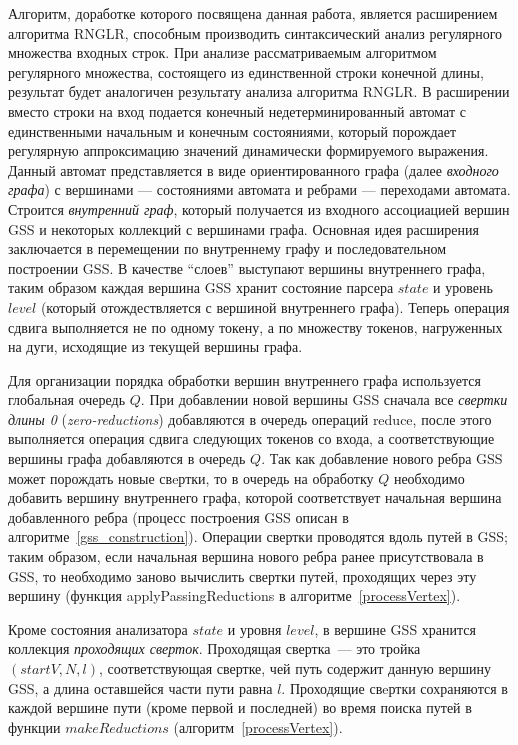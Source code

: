 Алгоритм, доработке которого посвящена данная работа, является расширением алгоритма RNGLR, способным производить синтаксический анализ регулярного множества входных строк. При анализе рассматриваемым алгоритмом регулярного множества, состоящего из единственной строки конечной длины, результат будет аналогичен результату анализа алгоритма RNGLR. В расширении вместо строки на вход подается конечный недетерминированный автомат с единственными начальным и конечным состояниями, который порождает регулярную аппроксимацию значений динамически формируемого выражения. Данный автомат представляется в виде ориентированного графа (далее \emph{входного графа}) с вершинами --- состояниями автомата и ребрами --- переходами автомата. Строится \emph{внутренний граф}, который получается из входного ассоциацией вершин GSS и некоторых коллекций с вершинами графа. Основная идея расширения заключается в перемещении по внутреннему графу и последовательном построении GSS. В качестве ``слоев'' выступают вершины внутреннего графа, таким образом каждая вершина GSS хранит состояние парсера $state$ и уровень $level$ (который отождествляется с вершиной внутреннего графа). Теперь операция сдвига выполняется не по одному токену, а по множеству токенов, нагруженных на дуги, исходящие из текущей вершины графа.

Для организации порядка обработки вершин внутреннего графа используется глобальная очередь $Q$. При добавлении новой вершины GSS сначала все \emph{свертки длины 0} (\emph{zero-reductions}) добавляются в очередь операций reduce, после этого выполняется операция сдвига следующих токенов со входа, а соответствующие вершины графа добавляются в очередь $Q$. Так как добавление нового ребра GSS может порождать новые свeртки, то в очередь на обработку $Q$ необходимо добавить вершину внутреннего графа, которой соответствует начальная вершина добавленного ребра (процесс построения GSS описан в алгоритме~\ref{gss_construction}). Операции свертки проводятся вдоль путей в GSS; таким образом, если начальная вершина нового ребра ранее присутствовала в GSS, то необходимо заново вычислить свертки путей, проходящих через эту вершину (функция applyPassingReductions в алгоритме~\ref{processVertex}).

Кроме состояния анализатора $state$ и уровня $level$, в вершине GSS хранится коллекция \emph{проходящих сверток}. Проходящая свертка~--- это тройка $(startV, N, l)$, соответствующая свертке, чей путь содержит данную вершину GSS, а длина оставшейся части пути равна $l$. Проходящие свeртки сохраняются в каждой вершине пути (кроме первой и последней) во время поиска путей в функции $makeReductions$ (алгоритм~\ref{processVertex}).

